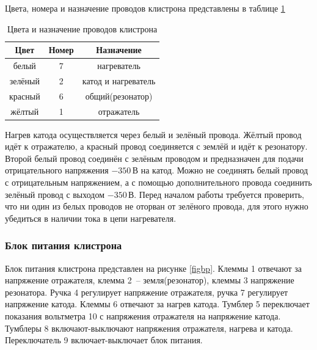 \documentclass[a4paper,14pt]{extarticle}
\begin{document}
	Цвета, номера и назначение проводов клистрона представлены в таблице \ref{tab2}
	\begin{table}[h]
		\center
        \caption{Цвета и назначение проводов клистрона}
        \label{tab2}
		\begin{tabular}{|c|c|c|}
			\hline
			Цвет 	& Номер	& Назначение \\ \hline
			белый 	& 	7	& нагреватель\\ \hline
			зелёный & 	2	& катод и нагреватель\\ \hline
			красный & 	6	& общий(резонатор)\\ \hline
			жёлтый  & 	1	& отражатель\\ \hline
		\end{tabular}
	\end{table}
	
	Нагрев катода осуществляется через белый и зелёный провода. Жёлтый провод идёт к отражателю, а красный провод соединяется с землёй и идёт к резонатору. Второй белый провод соединён с зелёным проводом и предназначен для подачи отрицательного напряжения $-350\,$В на катод. Можно не соединять белый провод с отрицательным напряжением, а с помощью дополнительного провода соединить зелёный провод с выходом $-350\,$В. Перед началом работы требуется проверить, что ни один из белых проводов не оторван от зелёного провода, для этого нужно убедиться в наличии тока в цепи нагревателя. 
	
	\subsubsection{Блок питания клистрона}
	
	Блок питания клистрона представлен на рисунке \ref{figbp}. Клеммы 1 отвечают за напряжение отражателя, клемма 2~-- земля(резонатор), клеммы 3 напряжение резонатора. Ручка 4 регулирует напряжение отражателя, ручка 7 регулирует напряжение катода. Клеммы 6 отвечают за нагрев катода. Тумблер 5 переключает показания вольтметра 10 с напряжения отражателя на напряжение катода. Тумблеры 8 включают-выключают напряжения отражателя, нагрева и катода. Переключатель 9 включает-выключает блок питания.
	
\end{document}
